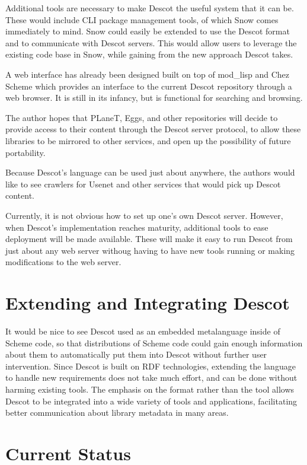 Additional tools are necessary to make Descot the useful system 
that it can be. These would include CLI package management tools, 
of which Snow comes immediately to mind. Snow could easily be 
extended to use the Descot format and to communicate with 
Descot servers. This would allow users to leverage the existing 
code base in Snow, while gaining from the new approach Descot 
takes. 

A web interface has already been designed built on top of mod\_lisp 
\cite{modlisp}
and Chez Scheme \cite{chez} which provides an interface to the current 
Descot repository through a web browser.  It is still in its 
infancy, but is functional for searching and browsing. 

The author hopes that PLaneT, Eggs, and other repositories 
will decide to provide access to their content through the Descot 
server protocol, to allow these libraries to be mirrored 
to other services, and open up the possibility of future 
portability. 

Because Descot's language can be used just about anywhere, 
the authors would like to see crawlers for Usenet and 
other services that would pick up Descot content. 

Currently, it is not obvious how to set up
one's own Descot server.  However, when Descot's implementation 
reaches maturity, additional tools to ease deployment will 
be made available.  These will make it easy to run Descot 
from just about any web server withoug having to have new tools 
running or making modifications to the web server.

\section{Extending and Integrating Descot}

It would be nice to see Descot used as an embedded metalanguage 
inside of Scheme code, so that distributions of Scheme code 
could gain enough information about them to automatically put 
them into Descot without further user intervention. Since Descot 
is built on RDF technologies, extending the language to handle 
new requirements does not take much effort, and can be done 
without harming existing tools. The emphasis on 
the format rather than the tool allows Descot to be integrated 
into a wide variety of tools and applications, facilitating 
better communication about library metadata in many areas.

\section{Current Status}

